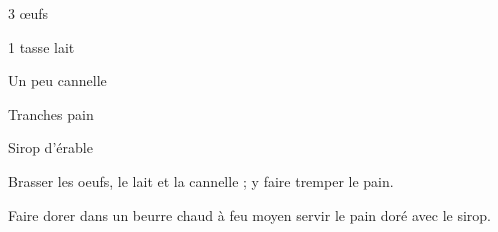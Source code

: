 %
%   
%   
%   
%




\totaltime{}


\begin{ingredients}
    \item 3 œufs
    \item 1 tasse lait
    \item Un peu cannelle
    \item Tranches pain
    \item Sirop d'érable
\end{ingredients}

\begin{steps}
    \item Brasser les oeufs, le lait et la cannelle ; y faire tremper le pain.
    \item Faire dorer dans un beurre chaud à feu moyen servir le pain doré avec le sirop.
\end{steps}
